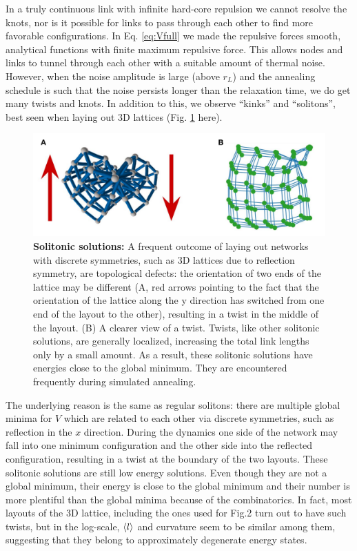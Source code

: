 \documentclass[endfloats,nofootinbib,preprint,floatfix,titlepage,superscriptaddress,linenumbers]{revtex4-1} %
\begin{document}
{In a truly continuous link with infinite hard-core repulsion we cannot resolve the knots, nor is it possible for links to pass through each other to find more favorable configurations. 
In Eq. \eqref{eq:Vfull} we made the repulsive forces smooth, analytical functions with finite maximum repulsive force. 
This allows nodes and links to tunnel through each other with a suitable amount of thermal noise.
However, when the noise amplitude is large (above $r_L$) and the annealing schedule is such that the noise persists longer than the relaxation time, we do get many twists and knots. 
In addition to this, we observe ``kinks'' and ``solitons'', best seen when laying out 3D lattices (Fig. \ref{fig:twist} here).
\begin{figure}[ht]
    \centering
    \includegraphics[width=.8\textwidth]{fig-09-19/3D-twist.pdf}
    \caption{{\bf Solitonic solutions:} A frequent outcome of laying out networks with discrete symmetries, such as 3D lattices due to reflection symmetry, are topological defects: the orientation of two ends of the lattice may be different (A, red arrows pointing to the fact that the orientation of the lattice along the y direction has switched from one end of the layout to the other), resulting in a twist in the middle of the layout. 
    (B) A clearer view of a twist. 
    Twists, like other solitonic solutions, are generally localized, increasing the total link lengths only by a small amount. 
    As a result, these solitonic solutions have energies close to the global minimum.
    They are encountered frequently during simulated annealing. 
    }
    \label{fig:twist}
\end{figure}
The underlying reason is the same as regular solitons: there are multiple global minima for $V$ which are related to each other via discrete symmetries, such as reflection in the $x$ direction. 
During the dynamics one side of the network may fall into one minimum configuration and the other side into the reflected configuration, resulting in a twist at the boundary of the two layouts. %
These solitonic solutions are still low energy solutions. 
Even though they are not a global minimum, their energy is close to the global minimum
and their number is more plentiful than the global minima because of the combinatorics. 
In fact, most layouts of the 3D lattice, including the ones used for Fig.2 turn out to have such twists, but in the log-scale, $\left<l\right>$ and curvature seem to be similar among them, suggesting that they belong to approximately degenerate energy states. 


}
\end{document}
